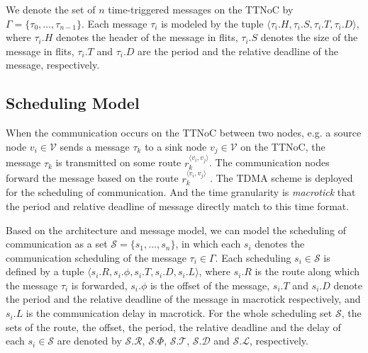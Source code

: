 \documentclass[10pt,journal]{IEEEtran}
\newcommand{\calV}{\mathcal{V}}
\newcommand{\calL}{\mathcal{L}}
\newcommand{\calS}{\mathcal{S}}
\newcommand{\calR}{\mathcal{R}}
\newcommand{\calD}{\mathcal{D}}
\newcommand{\calT}{\mathcal{T}}
\newcommand{\route}[3]{#1^{\langle #2,#3\rangle}}
\theoremstyle{remark}
\begin{document}
We denote the set of $n$ time-triggered messages on the TTNoC by $\Gamma = \{\tau_{0},\dots,\tau_{n-1}\}$. 
Each message $\tau_{i}$ is modeled by the tuple $\langle \tau_{i}.H,\tau_{i}.S, \tau_{i}.T,\tau_{i}.D\rangle$, 
 where $\tau_{i}.H$ denotes the header of the message in flits,
 $\tau_{i}.S$ denotes the size of the message in flits, 
 $\tau_{i}.T$ and $\tau_{i}.D$ are the period and the relative deadline of the message, respectively.
 
\subsection{Scheduling Model}
\label{ss:schmodel}

When the communication occurs on the TTNoC between two nodes,
 e.g. a source node $v_i\in \calV$ sends a message $\tau_{k}$ to a sink node $v_j\in \calV$ on the TTNoC,
  the message $\tau_k$ is transmitted on some route $\route{r_k}{v_i}{v_j}$. 
The communication nodes forward the message based on the route $\route{r_k}{v_i}{v_j}$ .
The TDMA scheme is deployed for the scheduling of communication.  
And the time granularity is \emph{macrotick} that the period and relative deadline of message directly match to this time format.

Based on the architecture and message model,
 we can model the scheduling of communication as a set $\calS=\{s_1,\ldots,s_n\}$,
  in which each $s_{i}$ denotes the communication scheduling of the message $\tau_{i}\in\Gamma$. 
Each scheduling $s_{i}\in\calS$ is defined by a tuple $\langle s_i.R, s_i.\phi, s_i.T, s_i.D, s_i.L\rangle$,
 where $s_i.R$ is the route along which the message $\tau_i$ is forwarded, 
 $s_i.\phi$ is the offset of the message,
  $s_i.T$ and
   $s_i.D$ denote the period and the relative deadline of the message in macrotick respectively,
    and $s_i.L$ is the communication delay in macrotick.
For the whole scheduling set $\calS$,
 the sets of the route,
 the offset,
  the period,
   the relative deadline and the delay of each $s_i\in\calS$ are denoted by $\calS.\calR$,
  $\calS.\Phi$,
   $\calS.\calT$,
    $\calS.\calD$ and $\calS.\calL$,
     respectively.

\end{document}
